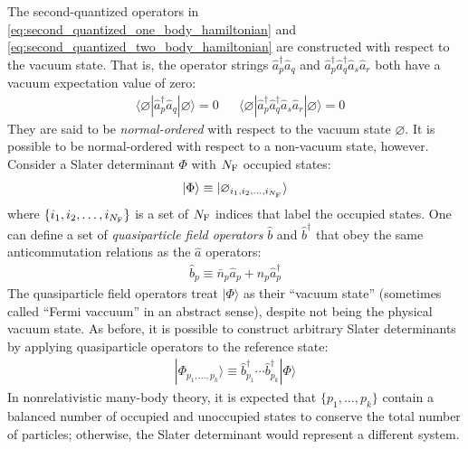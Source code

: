 \documentclass[amsmath, amssymb, aps, floatfix, nofootinbib, preprintnumbers,showpacs, superscriptaddress, twocolumn]{revtex4-1}
\newcommand{\ket}[1]{| #1 \rangle}
\newcommand{\bra}[1]{\langle #1 |}
\begin{document}
The second-quantized operators in \eqref{eq:second_quantized_one_body_hamiltonian} and \eqref{eq:second_quantized_two_body_hamiltonian} are constructed with respect to the vacuum state.  That is, the operator strings $\hat{a}_p^\dagger \hat{a}_q$ and $\hat{a}_p^\dagger \hat{a}_q^\dagger \hat{a}_s \hat{a}_r$ both have a vacuum expectation value of zero:
\begin{align*}
&\bra{\varnothing} \hat{a}_p^\dagger \hat{a}_q \ket{\varnothing} = 0 &
&\bra{\varnothing} \hat{a}_p^\dagger \hat{a}_q^\dagger \hat{a}_s \hat{a}_r \ket{\varnothing} = 0
\end{align*}
They are said to be \emph{normal-ordered} with respect to the vacuum state $\varnothing$.  It is possible to be normal-ordered with respect to a non-vacuum state, however.  Consider a Slater determinant $\Phi$ with $N_{\text F}$ occupied states:
\begin{align*}
  \ket{\Phi} \equiv \ket{\varnothing_{i_1, i_2, \ldots, i_{N_{\text F}}}}
\end{align*}
where $\{i_1, i_2, \ldots, i_{N_{\text F}}\}$ is a set of $N_{\text F}$ indices that label the occupied states.  One can define a set of \textit{quasiparticle field operators} $\hat b$ and $\hat b^\dagger$ that obey the same anticommutation relations as the $\hat a$ operators:
\begin{align*}
  \hat b_p \equiv \bar n_p \hat a_{p} + n_p \hat a_{p}^\dagger
\end{align*}
The quasiparticle field operators treat $\ket{\Phi}$ as their ``vacuum state'' (sometimes called ``Fermi vaccuum'' in an abstract sense), despite not being the physical vacuum state.  As before, it is possible to construct arbitrary Slater determinants by applying quasiparticle operators to the reference state:
\begin{align}
  \ket{\Phi_{p_1, \ldots, p_k}} \equiv \hat{b}^\dagger_{p_1} \cdots \hat{b}^\dagger_{p_k} \ket{\Phi}
  \label{eq:quasisd}
\end{align}
In nonrelativistic many-body theory, it is expected that $\{p_1, \ldots, p_k\}$ contain a balanced number of occupied and unoccupied states to conserve the total number of particles; otherwise, the Slater determinant would represent a different system.
\end{document}
